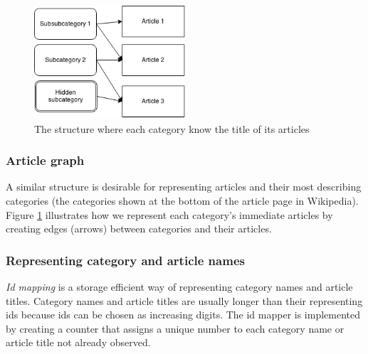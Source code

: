 \begin{figure}
\centering
\includegraphics[width=0.5\textwidth]{Chapters/Methods/categories-articles}
\caption{The structure where each category know the title of its articles}
\label{fig:articlestructure}
\end{figure}


\subsubsection{Article graph}
A similar structure is desirable for representing articles and their most describing categories (the categories shown at the bottom of the article page in Wikipedia). Figure \ref{fig:articlestructure} illustrates how we represent each category's immediate articles by creating edges (arrows) between categories and their articles. 




\subsubsection{Representing category and article names}
\emph{Id mapping} is a storage efficient way of representing category names and article titles. Category names and article titles are usually longer than their representing ids because ids can be chosen as increasing digits. The id mapper is implemented by creating a counter that assigns a unique number to each category name or article title not already observed. 


